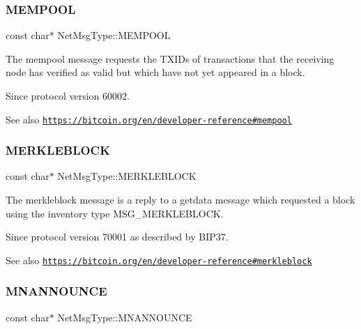 \subsubsection{\texorpdfstring{M\+E\+M\+P\+O\+OL}{MEMPOOL}}
{\footnotesize\ttfamily const char$\ast$ Net\+Msg\+Type\+::\+M\+E\+M\+P\+O\+OL}

The mempool message requests the T\+X\+I\+Ds of transactions that the receiving node has verified as valid but which have not yet appeared in a block. \begin{DoxySince}{Since}
protocol version 60002. 
\end{DoxySince}
\begin{DoxySeeAlso}{See also}
\href{https://bitcoin.org/en/developer-reference#mempool}{\tt https\+://bitcoin.\+org/en/developer-\/reference\#mempool} 
\end{DoxySeeAlso}
\mbox{\label{namespace_net_msg_type_a7c75f634586f1ffdcefd86961e41eb27}} 
\subsubsection{\texorpdfstring{M\+E\+R\+K\+L\+E\+B\+L\+O\+CK}{MERKLEBLOCK}}
{\footnotesize\ttfamily const char$\ast$ Net\+Msg\+Type\+::\+M\+E\+R\+K\+L\+E\+B\+L\+O\+CK}

The merkleblock message is a reply to a getdata message which requested a block using the inventory type M\+S\+G\+\_\+\+M\+E\+R\+K\+L\+E\+B\+L\+O\+CK. \begin{DoxySince}{Since}
protocol version 70001 as described by B\+I\+P37. 
\end{DoxySince}
\begin{DoxySeeAlso}{See also}
\href{https://bitcoin.org/en/developer-reference#merkleblock}{\tt https\+://bitcoin.\+org/en/developer-\/reference\#merkleblock} 
\end{DoxySeeAlso}
\mbox{\label{namespace_net_msg_type_a2ca7bfe05d443f7a5d967d0fe3be95e5}} 
\subsubsection{\texorpdfstring{M\+N\+A\+N\+N\+O\+U\+N\+CE}{MNANNOUNCE}}
{\footnotesize\ttfamily const char$\ast$ Net\+Msg\+Type\+::\+M\+N\+A\+N\+N\+O\+U\+N\+CE}

